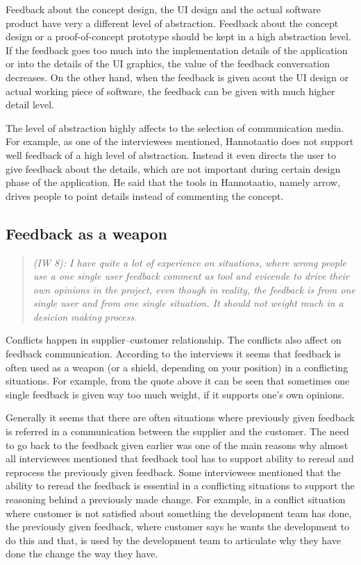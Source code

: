 \documentclass[english,12pt,a4paper,pdftex]{article}
\newcommand{\q}[2]{
\begin{quote}
\emph{(IW #1): #2}
\end{quote}}
\begin{document}
Feedback about the concept design, the \ac{UI} design and the actual software product have very a different level of abstraction. Feedback about the concept design or a proof-of-concept prototype should be kept in a high abstraction level. If the feedback goes too much into the implementation details of the application or into the details of the \ac{UI} graphics, the value of the feedback conversation decreases. On the other hand, when the feedback is given acout the \ac{UI} design or actual working piece of software, the feedback can be given with much higher detail level.

The level of abstraction highly affects to the selection of communication media. For example, as one of the interviewees mentioned, Hannotaatio does not support well feedback of a high level of abstraction. Instead it even directs the user to give feedback about the details, which are not important during certain design phase of the application. He said that the tools in Hannotaatio, namely arrow, drives people to point details instead of commenting the concept.

\subsection{Feedback as a weapon}

\q{8}{I have quite a lot of experience on situations, where wrong people use a one single user feedback comment as tool and evicende to drive their own opinions in the project, even though in reality, the feedback is from one single user and from one single situation. It should not weight much in a desicion making process.}

Conflicts happen in supplier--customer relationship. The conflicts also affect on feedback communication. According to the interviews it seems that feedback is often used as a weapon (or a shield, depending on your position) in a conflicting situations. For example, from the quote above it can be seen that sometimes one single feedback is given way too much weight, if it supports one's own opinions.

Generally it seems that there are often situations where previously given feedback is referred in a communication between the supplier and the customer. The need to go back to the feedback given earlier was one of the main reasons why almost all interviewees mentioned that feedback tool has to support ability to reread and reprocess the previously given feedback. Some interviewees mentioned that the ability to reread the feedback is essential in a conflicting situations to support the reasoning behind a previously made change. For example, in a conflict situation where customer is not satisfied about something the development team has done, the previously given feedback, where customer says he wants the development to do this and that, is used by the development team to articulate why they have done the change the way they have.
\end{document}
